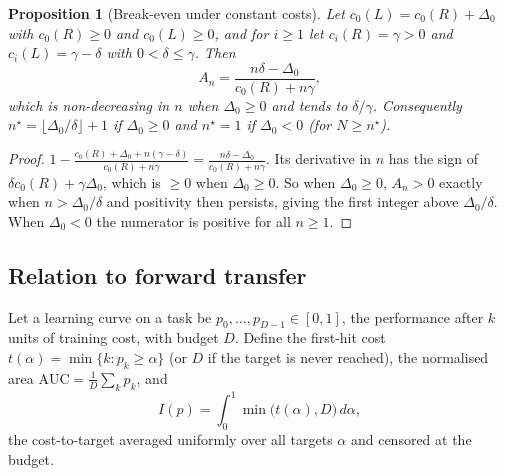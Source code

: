 \documentclass[11pt]{article}
\newtheorem{proposition}{Proposition}
\theoremstyle{remark}
\begin{document}
\begin{proposition}[Break-even under constant costs]\label{prop:be}
Let $c_0(L)=c_0(R)+\Delta_0$ with $c_0(R)\ge 0$ and $c_0(L)\ge 0$, and for $i\ge1$ let $c_i(R)=\gamma>0$ and $c_i(L)=\gamma-\delta$ with $0<\delta\le\gamma$. Then
\[
A_n = \frac{n\delta-\Delta_0}{c_0(R)+n\gamma},
\]
which is non-decreasing in $n$ when $\Delta_0\ge 0$ and tends to $\delta/\gamma$. Consequently $n^\star = \lfloor \Delta_0/\delta\rfloor+1$ if $\Delta_0\ge 0$ and $n^\star=1$ if $\Delta_0<0$ (for $N\ge n^\star$).
\end{proposition}
\begin{proof}
$1-\frac{c_0(R)+\Delta_0+n(\gamma-\delta)}{c_0(R)+n\gamma} = \frac{n\delta-\Delta_0}{c_0(R)+n\gamma}$. Its derivative in $n$ has the sign of $\delta c_0(R)+\gamma\Delta_0$, which is $\ge 0$ when $\Delta_0\ge0$. So when $\Delta_0\ge 0$, $A_n>0$ exactly when $n>\Delta_0/\delta$ and positivity then persists, giving the first integer above $\Delta_0/\delta$. When $\Delta_0<0$ the numerator is positive for all $n\ge1$.
\end{proof}

\subsection{Relation to forward transfer}\label{sec:ft}

Let a learning curve on a task be $p_0,\dots,p_{D-1}\in[0,1]$, the performance after $k$ units of training cost, with budget $D$.
Define the first-hit cost $t(\alpha)=\min\{k: p_k\ge\alpha\}$ (or $D$ if the target is never reached), the normalised area $\mathrm{AUC}=\frac1D\sum_k p_k$, and
\[
I(p) = \int_0^1 \min\bigl(t(\alpha),D\bigr)\,d\alpha ,
\]
the cost-to-target averaged uniformly over all targets $\alpha$ and censored at the budget.
\end{document}
